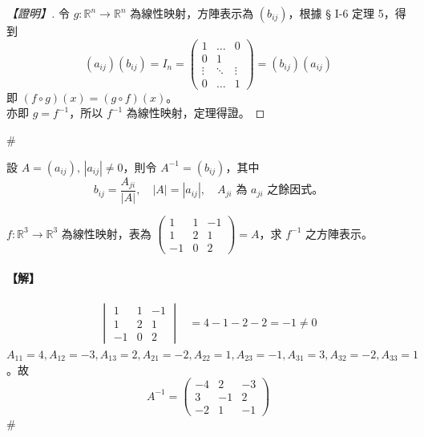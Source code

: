 \begin{proof}[【證明】]
令 $g: \mathbb{R}^n \longrightarrow \mathbb{R}^n$ 為線性映射，方陣表示為 $(b_{ij})$，根據 § I-6 定理 5，得到
\begin{equation}
(a_{ij})(b_{ij}) = I_n = \begin{pmatrix}
1 & \dots & 0 \\
0 & 1 & \\
\vdots & \ddots & \vdots \\
0 & \dots & 1
\end{pmatrix} = (b_{ij})(a_{ij}) \label{eq:b6-1-7-10}
\end{equation}
即 $(f \circ g)(x) = (g \circ f)(x)$。\\
亦即 $g = f^{-1}$，所以 $f^{-1}$ 為線性映射，定理得證。
\end{proof}\hfill$\#$

\begin{definition*}\label{def:b6-1-11}
設 $A=(a_{ij}),\, |a_{ij}| \ne 0$，則令 $A^{-1} = (b_{ij})$，其中
\[ b_{ij} = \dfrac{A_{ji}}{|A|},\quad |A|=|a_{ij}|,\quad A_{ji} \text{ 為 } a_{ji} \text{ 之餘因式。} \]
\end{definition*}

\begin{example}[*]\label{ex:b6-1-40}
$f: \mathbb{R}^3 \longrightarrow \mathbb{R}^3$ 為線性映射，表為 $\begin{pmatrix} 1 & 1 & -1 \\ 1 & 2 & 1 \\ -1 & 0 & 2 \end{pmatrix} = A$，求 $f^{-1}$ 之方陣表示。
\end{example}

\paragraph{【解】}
\begin{align*}
\begin{vmatrix}
1 & 1 & -1 \\
1 & 2 & 1 \\
-1 & 0 & 2
\end{vmatrix} &= 4 - 1 - 2 - 2 = -1 \ne 0
\end{align*}
$A_{11}=4, A_{12}=-3, A_{13}=2, A_{21}=-2, A_{22}=1, A_{23}=-1, A_{31}=3, A_{32}=-2, A_{33}=1$。故
\[ A^{-1} = \begin{pmatrix}
-4 & 2 & -3 \\
3 & -1 & 2 \\
-2 & 1 & -1
\end{pmatrix} \]\hfill$\#$

